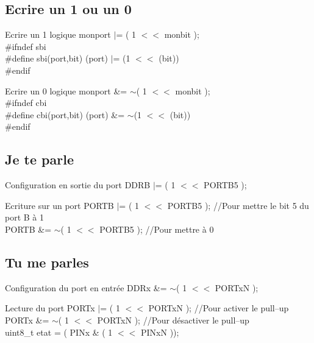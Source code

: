 \documentclass{beamer}
\begin{document}
\subsection{Ecrire un 1 ou un 0}

\begin{frame}
  \pause
  \begin{block}{Ecrire un 1 logique}
    \pause
    monport $|$= ( 1 $<$$<$ monbit );\\
    \pause
    \#ifndef sbi\\
    \#define sbi(port,bit) (port) $|$= (1 $<$$<$ (bit))\\
    \#endif
  \end{block}
  \pause
  \begin{block}{Ecrire un 0 logique}
    \pause
    monport \&= $\sim$( 1 $<$$<$ monbit );\\
    \pause
    \#ifndef cbi\\
    \#define cbi(port,bit) (port) \&= $\sim$(1 $<$$<$ (bit))\\
    \#endif\\
  \end{block}
\end{frame}


\subsection{Je te parle}

\begin{frame}
  \pause
  \begin{block}{Configuration en sortie du port}
    \pause
    DDRB $|$= ( 1 $<$$<$ PORTB5 );
  \end{block}
  \pause
  \begin{block}{Ecriture sur un port}
    \pause
    PORTB $|$= ( 1 $<$$<$ PORTB5 ); //Pour mettre le bit 5 du port B \`a 1\\
    \pause
    PORTB \&= $\sim$( 1 $<$$<$ PORTB5 ); //Pour mettre \`a 0 
  \end{block}
\end{frame}

\subsection{Tu me parles}

\begin{frame}
  \pause
  \begin{block}{Configuration du port en entr\'ee}
    \pause
    DDRx \&= $\sim$( 1 $<$$<$ PORTxN );
  \end{block}
  \pause
  \begin{block}{Lecture du port}
    \pause
    PORTx $|$= ( 1 $<$$<$ PORTxN ); //Pour activer le pull--up\\
    PORTx \&= $\sim$( 1 $<$$<$ PORTxN ); //Pour d\'esactiver le pull--up\\
    \pause
    uint8\_t etat = ( PINx \& ( 1 $<$$<$ PINxN ));
  \end{block}
\end{frame}
\end{document}
